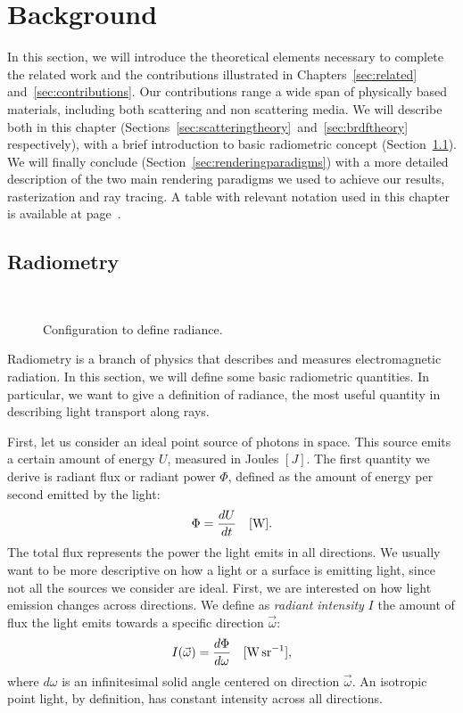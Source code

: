 \chapter{Background}
\label{sec:background}

In this section, we will introduce the theoretical elements necessary to complete the related work and the contributions illustrated in Chapters~\ref{sec:related} and~\ref{sec:contributions}. Our contributions range a wide span of physically based materials, including both scattering and non scattering media. We will describe both in this chapter (Sections~\ref{sec:scatteringtheory}~and~\ref{sec:brdftheory} respectively), with a brief introduction to basic radiometric concept (Section~\ref{sec:radiometry}). We will finally conclude (Section~\ref{sec:renderingparadigms}) with a more detailed description of the two main rendering paradigms we used to achieve our results, rasterization and ray tracing. A table with relevant notation used in this chapter is available at page~\pageref{sec:symbols}.

\section{Radiometry}
\label{sec:radiometry}
\begin{figure}
\centering
   \def\svgwidth{0.5\textwidth}
    \\
\caption{Configuration to define radiance.} %
\label{fig:radiance}
\end{figure}
Radiometry is a branch of physics that describes and measures electromagnetic radiation. In this section, we will define some basic radiometric quantities. In particular, we want to give a definition of radiance, the most useful quantity in describing light transport along rays.

First, let us consider an ideal point source of photons in space. This source emits a certain amount of energy $U$, measured in Joules $[J]$. The first quantity we derive is radiant flux or radiant power $\Phi$, defined as the amount of energy per second emitted by the light:
\begin{equation*}
\Phi = \frac{d U}{d t}  \ \ \ [\SI{}{\watt}].
\end{equation*}
The total flux represents the power the light emits in all directions. We usually want to be more descriptive on how a light or a surface is emitting light, since not all the sources we consider are ideal. First, we are interested on how light emission changes across directions.  We  define as \emph{radiant intensity} $I$ the amount of flux the light emits towards a specific direction $\vec{\omega}$:
\begin{equation*}
I(\vec{\omega}) = \frac{d \Phi}{d \omega}  \siunit{\watt \per \steradian},
\end{equation*}   
where $d \omega$ is an infinitesimal solid angle centered on direction $\vec{\omega}$. An isotropic point light, by definition, has constant intensity across all directions.


